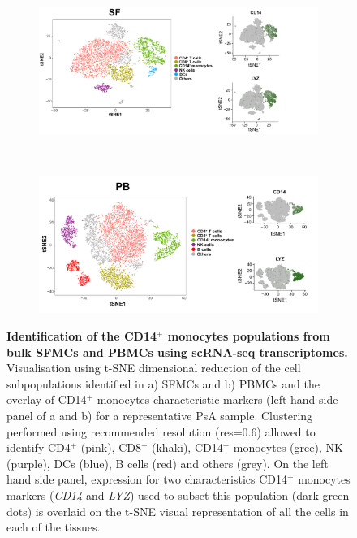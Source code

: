 \bigskip
\begin{figure}[htbp]
\centering
\begin{subfigure}[b]{0.70\textwidth}
\centering 
\includegraphics[width=\textwidth]{./Appendix/pdfs/Chapter5/PSA_SF_clusters_and_monocytes_markers}
\caption{}
\end{subfigure}
~
\begin{subfigure}[b]{0.70\textwidth} 
\centering
\includegraphics[width=\textwidth]{./Appendix/pdfs/Chapter5/PSA_PB_clusters_and_monocytes_markers}
\caption{}
\end{subfigure}
\caption[Identification of the CD14$^+$ monocytes populations from bulk SFMCs and PBMCs using scRNA-seq transcriptomes.]{\textbf{Identification of the CD14$^+$ monocytes populations from bulk SFMCs and PBMCs using scRNA-seq transcriptomes.} Visualisation using t-SNE dimensional reduction of the cell subpopulations identified in a) SFMCs and b) PBMCs and the overlay of CD14$^+$ monocytes characteristic markers (left hand side panel of a and b) for a representative PsA sample. Clustering performed using recommended resolution (res=0.6) allowed to identify CD4$^+$ (pink), CD8$^+$ (khaki), CD14$^+$ monocytes (gree), NK (purple), DCs (blue), B cells (red) and others (grey). On the left hand side panel, expression for two characteristics CD14$^+$ monocytes markers (\textit{CD14} and \textit{LYZ}) used to subset this population (dark green dots) is overlaid on the t-SNE visual representation of all the cells in each of the tissues.}
\label{figure:PsA_scRNAseq_SF_an_PB_monocytes_identification_from_bulk}
\end{figure}



